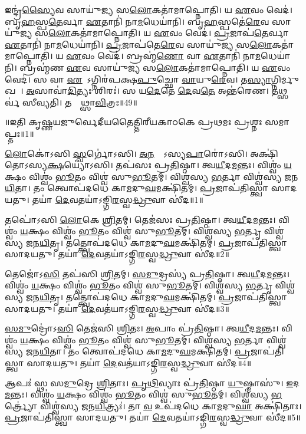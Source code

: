    𑌇𑌨𑍍𑌦𑍍𑌰॑\ul{𑌸𑍍𑌯𑍈}𑌵 𑌸𑌾𑌯𑍁॑𑌜𑍍𑌯 𑌸\ul{𑌲𑍋}𑌕𑌤𑌾॑𑌮𑌾𑌪𑍍𑌨𑍋𑌤𑌿।
   𑌯 \ul{𑌏}𑌵𑌂 𑌵𑍇𑌦॑।
   𑌬𑍃\ul{𑌹}𑌸𑍍𑌪\ul{𑌤𑍇}𑌰𑍍𑌵𑌾 \ul{𑌏}𑌤𑌾𑌨𑌿॑ 𑌨𑌾\ul{𑌮}𑌧𑍇𑌯𑌾॑𑌨𑌿।
   𑌬𑍃\ul{𑌹}𑌸𑍍𑌪𑌤𑍇॑\ul{𑌰𑍇}𑌵 𑌸𑌾𑌯𑍁॑𑌜𑍍𑌯 𑌸\ul{𑌲𑍋}𑌕𑌤𑌾॑𑌮𑌾𑌪𑍍𑌨𑍋𑌤𑌿।
   𑌯 \ul{𑌏}𑌵𑌂 𑌵𑍇𑌦॑।
   \ul{𑌪𑍍𑌰}𑌜𑌾𑌪॑\ul{𑌤𑍇}𑌰𑍍𑌵𑌾 \ul{𑌏}𑌤𑌾𑌨𑌿॑ 𑌨𑌾\ul{𑌮}𑌧𑍇𑌯𑌾॑𑌨𑌿।
   \ul{𑌪𑍍𑌰}𑌜𑌾𑌪॑𑌤𑍇\ul{𑌰𑍇}𑌵 𑌸𑌾𑌯𑍁॑𑌜𑍍𑌯 𑌸\ul{𑌲𑍋}𑌕𑌤𑌾॑𑌮𑌾𑌪𑍍𑌨𑍋𑌤𑌿।
   𑌯 \ul{𑌏}𑌵𑌂 𑌵𑍇𑌦॑।
   𑌬𑍍𑌰𑌹𑍍𑌮॑\ul{𑌣𑍋} 𑌵𑌾 \ul{𑌏}𑌤𑌾𑌨𑌿॑ 𑌨𑌾\ul{𑌮}𑌧𑍇𑌯𑌾॑𑌨𑌿।
   𑌬𑍍𑌰𑌹𑍍𑌮॑𑌣 \ul{𑌏}𑌵 𑌸𑌾𑌯𑍁॑𑌜𑍍𑌯 𑌸\ul{𑌲𑍋}𑌕𑌤𑌾॑𑌮𑌾𑌪𑍍𑌨𑍋𑌤𑌿।
   𑌯 \ul{𑌏}𑌵𑌂 𑌵𑍇𑌦॑।
   𑌸 𑌵𑌾 \ul{𑌏}𑌷𑍋᳚𑌽𑌗𑍍𑌨𑌿𑌰॑𑌪𑌕𑍍𑌷\ul{𑌪𑍁}𑌚𑍍𑌛𑍋 \ul{𑌵𑌾}𑌯𑍁\ul{𑌰𑍇}𑌵।
   𑌤\ul{𑌸𑍍𑌯𑌾}𑌗𑍍𑌨𑌿𑌰𑍍𑌮𑍁𑌖𑌮𑍍᳚।
   \ul{𑌅}𑌸𑌾𑌵𑌾॑\ul{𑌦𑌿}𑌤𑍍𑌯𑌃 𑌶𑌿𑌰𑌃॑।
   𑌸 𑌯\ul{𑌦𑍇}𑌤𑍇 \ul{𑌦𑍇}𑌵\ul{𑌤𑍇} 𑌅𑌨𑍍𑌤॑𑌰𑍇𑌣।
   𑌤𑌥𑍍𑌸𑌰𑍍𑌵॑ 𑌸𑍀𑌵𑍍𑌯𑌤𑌿।
   𑌤𑌸𑍍𑌮𑌾᳚𑌥𑍍𑌸𑌾\ul{𑌵𑌿}𑌤𑍍𑌰𑌃॥49॥
   \anuvakamend
   
॥𑌇𑌤𑌿 𑌕𑍃𑌷𑍍𑌣𑌯𑌜𑍁𑌰𑍍𑌵𑍇𑌦𑍀𑌯𑌤𑍈𑌤𑍍𑌤𑌿𑌰𑍀𑌯𑌕𑌾𑌠𑌕𑍇 𑌪𑍍𑌰𑌥𑌮𑌃 𑌪𑍍𑌰𑌶𑍍𑌨𑌃 𑌸𑌮𑌾𑌪𑍍𑌤𑌃॥1॥

\setcounter{anuvakam}{0}

   \ul{𑌲𑍋}𑌕𑍋॑𑌽𑌸𑌿 \ul{𑌸𑍍𑌵}𑌰𑍍𑌗𑍋॑𑌽𑌸𑌿।
   \ul{𑌅}\ul{𑌨}𑌨𑍍𑌤𑍋᳚𑌽𑌸𑍍𑌯\ul{𑌪𑌾}𑌰𑍋॑𑌽𑌸𑌿।
   𑌅𑌕𑍍𑌷𑌿॑𑌤𑍋\-𑌽𑌸𑍍𑌯\ul{𑌕𑍍𑌷}𑌯𑍍𑌯𑍋॑\-𑌽𑌸𑌿।
   𑌤𑌪॑𑌸𑌃 𑌪𑍍𑌰\ul{𑌤𑌿}𑌷𑍍𑌠𑌾।
   𑌤𑍍𑌵\ul{𑌯𑍀}𑌦\ul{𑌮}𑌨𑍍𑌤𑌃।
   𑌵𑌿𑌶𑍍𑌵𑌂॑ \ul{𑌯}𑌕𑍍𑌷𑌂 𑌵𑌿𑌶𑍍𑌵𑌂॑ \ul{𑌭𑍂}𑌤𑌂 𑌵𑌿𑌶𑍍𑌵॑ 𑌸𑍁\ul{𑌭𑍂}𑌤𑌮𑍍।
   𑌵𑌿𑌶𑍍𑌵॑𑌸𑍍𑌯 \ul{𑌭}𑌰𑍍𑌤𑌾 𑌵𑌿𑌶𑍍𑌵॑𑌸𑍍𑌯 𑌜𑌨\ul{𑌯𑌿}𑌤𑌾।
   𑌤𑌂 𑌤𑍍𑌵𑍋𑌪॑𑌦𑌧𑍇 𑌕𑌾\ul{𑌮}𑌦𑍁\ul{𑌘}𑌮𑌕𑍍𑌷𑌿॑𑌤𑌮𑍍।
   \ul{𑌪𑍍𑌰}𑌜𑌾𑌪॑𑌤𑌿𑌸𑍍𑌤𑍍𑌵𑌾 𑌸𑌾𑌦𑌯𑌤𑍁।
   𑌤𑌯𑌾॑ \ul{𑌦𑍇}𑌵𑌤𑌯𑌾॑𑌽𑌙𑍍𑌗𑌿\ul{𑌰}𑌸𑍍𑌵\ul{𑌦𑍍𑌧𑍍𑌰𑍁}𑌵𑌾 𑌸𑍀॑𑌦॥1॥

   𑌤𑌪𑍋॑𑌽𑌸𑌿 \ul{𑌲𑍋}𑌕𑍇 \ul{𑌶𑍍𑌰𑌿}𑌤𑌮𑍍।
   𑌤𑍇𑌜॑𑌸𑌃 𑌪𑍍𑌰\ul{𑌤𑌿}𑌷𑍍𑌠𑌾।
   𑌤𑍍𑌵\ul{𑌯𑍀}𑌦\ul{𑌮}𑌨𑍍𑌤𑌃।
   𑌵𑌿𑌶𑍍𑌵𑌂॑ \ul{𑌯}𑌕𑍍𑌷𑌂 𑌵𑌿𑌶𑍍𑌵𑌂॑ \ul{𑌭𑍂}𑌤𑌂 𑌵𑌿𑌶𑍍𑌵॑ 𑌸𑍁\ul{𑌭𑍂}𑌤𑌮𑍍।
   𑌵𑌿𑌶𑍍𑌵॑𑌸𑍍𑌯 \ul{𑌭}𑌰𑍍𑌤𑍃 𑌵𑌿𑌶𑍍𑌵॑𑌸𑍍𑌯 𑌜𑌨\ul{𑌯𑌿}𑌤𑍃।
   𑌤𑌤𑍍𑌤𑍍𑌵𑍋𑌪॑𑌦𑌧𑍇 𑌕𑌾\ul{𑌮}𑌦𑍁\ul{𑌘}𑌮𑌕𑍍𑌷𑌿॑𑌤𑌮𑍍।
   \ul{𑌪𑍍𑌰}𑌜𑌾𑌪॑𑌤𑌿𑌸𑍍𑌤𑍍𑌵𑌾 𑌸𑌾𑌦𑌯𑌤𑍁।
   𑌤𑌯𑌾॑ \ul{𑌦𑍇}𑌵𑌤𑌯𑌾॑𑌽𑌙𑍍𑌗𑌿\ul{𑌰}𑌸𑍍𑌵\ul{𑌦𑍍𑌧𑍍𑌰𑍁}𑌵𑌾 𑌸𑍀॑𑌦॥2॥

   𑌤𑍇𑌜𑍋॑𑌽\ul{𑌸𑌿} 𑌤𑌪॑𑌸𑌿 \ul{𑌶𑍍𑌰𑌿}𑌤𑌮𑍍।
   \ul{𑌸}\ul{𑌮𑍁}𑌦𑍍𑌰𑌸𑍍𑌯॑ 𑌪𑍍𑌰\ul{𑌤𑌿}𑌷𑍍𑌠𑌾।
   𑌤𑍍𑌵\ul{𑌯𑍀}𑌦\ul{𑌮}𑌨𑍍𑌤𑌃।
   𑌵𑌿𑌶𑍍𑌵𑌂॑ \ul{𑌯}𑌕𑍍𑌷𑌂 𑌵𑌿𑌶𑍍𑌵𑌂॑ \ul{𑌭𑍂}𑌤𑌂 𑌵𑌿𑌶𑍍𑌵॑ 𑌸𑍁\ul{𑌭𑍂}𑌤𑌮𑍍।
   𑌵𑌿𑌶𑍍𑌵॑𑌸𑍍𑌯 \ul{𑌭}𑌰𑍍𑌤𑍃 𑌵𑌿𑌶𑍍𑌵॑𑌸𑍍𑌯 𑌜𑌨\ul{𑌯𑌿}𑌤𑍃।
   𑌤𑌤𑍍𑌤𑍍𑌵𑍋𑌪॑𑌦𑌧𑍇 𑌕𑌾\ul{𑌮}𑌦𑍁\ul{𑌘}𑌮𑌕𑍍𑌷𑌿॑𑌤𑌮𑍍।
   \ul{𑌪𑍍𑌰}𑌜𑌾𑌪॑𑌤𑌿𑌸𑍍𑌤𑍍𑌵𑌾 𑌸𑌾𑌦𑌯𑌤𑍁।
   𑌤𑌯𑌾॑ \ul{𑌦𑍇}𑌵𑌤॑𑌯𑌾𑌽𑌙𑍍𑌗𑌿\ul{𑌰}𑌸𑍍𑌵\ul{𑌦𑍍𑌧𑍍𑌰𑍁}𑌵𑌾 𑌸𑍀॑𑌦॥3॥

   \ul{𑌸}\ul{𑌮𑍁}𑌦𑍍𑌰𑍋॑𑌽\ul{𑌸𑌿} 𑌤𑍇𑌜॑𑌸𑌿 \ul{𑌶𑍍𑌰𑌿}𑌤𑌃।
   \ul{𑌅}𑌪𑌾𑌂 𑌪𑍍𑌰॑\ul{𑌤𑌿}𑌷𑍍𑌠𑌾।
   𑌤𑍍𑌵\ul{𑌯𑍀}𑌦\ul{𑌮}𑌨𑍍𑌤𑌃।
   𑌵𑌿𑌶𑍍𑌵𑌂॑ \ul{𑌯}𑌕𑍍𑌷𑌂 𑌵𑌿𑌶𑍍𑌵𑌂॑ \ul{𑌭𑍂}𑌤𑌂 𑌵𑌿𑌶𑍍𑌵॑ 𑌸𑍁\ul{𑌭𑍂}𑌤𑌮𑍍।
   𑌵𑌿𑌶𑍍𑌵॑𑌸𑍍𑌯 \ul{𑌭}𑌰𑍍𑌤𑌾 𑌵𑌿𑌶𑍍𑌵॑𑌸𑍍𑌯 𑌜𑌨\ul{𑌯𑌿}𑌤𑌾।
   𑌤𑌂 𑌤𑍍𑌵𑍋𑌪॑𑌦𑌧𑍇 𑌕𑌾\ul{𑌮}𑌦𑍁\ul{𑌘}𑌮𑌕𑍍𑌷𑌿॑𑌤𑌮𑍍।
   \ul{𑌪𑍍𑌰}𑌜𑌾𑌪॑𑌤𑌿𑌸𑍍𑌤𑍍𑌵𑌾 𑌸𑌾𑌦𑌯𑌤𑍁।
   𑌤𑌯𑌾॑ \ul{𑌦𑍇}𑌵𑌤॑𑌯𑌾𑌽𑌙𑍍𑌗𑌿\ul{𑌰}𑌸𑍍𑌵\ul{𑌦𑍍𑌧𑍍𑌰𑍁}𑌵𑌾 𑌸𑍀॑𑌦॥4॥

   𑌆𑌪𑌃॑ 𑌸𑍍𑌥 𑌸\ul{𑌮𑍁}𑌦𑍍𑌰𑍇 \ul{𑌶𑍍𑌰𑌿}𑌤𑌾𑌃।
   \ul{𑌪𑍃}\ul{𑌥𑌿}𑌵𑍍𑌯𑌾𑌃 𑌪𑍍𑌰॑\ul{𑌤𑌿}𑌷𑍍𑌠𑌾 \ul{𑌯𑍁}𑌷𑍍𑌮𑌾𑌸𑍁॑।
   \ul{𑌇}𑌦\ul{𑌮}𑌨𑍍𑌤𑌃।
   𑌵𑌿𑌶𑍍𑌵𑌂॑ \ul{𑌯}𑌕𑍍𑌷𑌂 𑌵𑌿𑌶𑍍𑌵𑌂॑ \ul{𑌭𑍂}𑌤𑌂 𑌵𑌿𑌶𑍍𑌵॑ 𑌸𑍁\ul{𑌭𑍂}𑌤𑌮𑍍।
   𑌵𑌿𑌶𑍍𑌵॑𑌸𑍍𑌯 \ul{𑌭}𑌰𑍍𑌤𑍍𑌰𑍍𑌯𑍋॑ 𑌵𑌿𑌶𑍍𑌵॑𑌸𑍍𑌯 𑌜𑌨\ul{𑌯𑌿}𑌤𑍍𑌰𑍍𑌯𑌃॑।
   𑌤𑌾 \ul{𑌵} 𑌉𑌪॑𑌦𑌧𑍇 𑌕𑌾\ul{𑌮}𑌦𑍁\ul{𑌘𑌾} 𑌅𑌕𑍍𑌷𑌿॑𑌤𑌾𑌃।
   \ul{𑌪𑍍𑌰}𑌜𑌾𑌪॑𑌤𑌿𑌸𑍍𑌤𑍍𑌵𑌾 𑌸𑌾𑌦𑌯𑌤𑍁।
   𑌤𑌯𑌾॑ \ul{𑌦𑍇}𑌵𑌤𑌯𑌾॑𑌽𑌙𑍍𑌗𑌿\ul{𑌰}𑌸𑍍𑌵\ul{𑌦𑍍𑌧𑍍𑌰𑍁}𑌵𑌾 𑌸𑍀॑𑌦॥5॥

